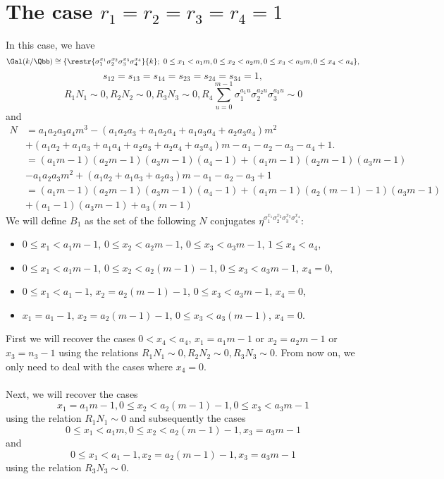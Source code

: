 \section{The case $r_1=r_2=r_3=r_4=1$}
In this case, we have
$$\Gal(k/\Qbb)\cong
 \{\restr{\sigma_1^{x_1}\sigma_2^{x_2}\sigma_3^{x_3}\sigma_4^{x_4}}{k};~  0\leq x_1<a_1m, 0\leq x_2<a_2m, 0\leq x_3<a_3m,0\leq x_4<a_4\},$$
 $$s_{12}=s_{13}=s_{14}=s_{23}=s_{24}=s_{34}=1,$$
$$R_1N_1\sim 0, R_2N_2\sim 0, R_3N_3 \sim 0, R_4 \sum_{u=0}^{m-1}\sigma_1^{a_1u}\sigma_2^{a_2u}\sigma_3^{a_3u} \sim 0$$
and
\begin{align*}
N&=a_1a_2a_3a_4m^3-(a_1a_2a_3+a_1a_2a_4+a_1a_3a_4+a_2a_3a_4)m^2\\
&+(a_1a_2+a_1a_3+a_1a_4+a_2a_3+a_2a_4+a_3a_4)m-a_1-a_2-a_3-a_4+1.\\
&=(a_1m-1)(a_2m-1)(a_3m-1)(a_4-1)+(a_1m-1)(a_2m-1)(a_3m-1)\\
&-a_1a_2a_3m^2+(a_1a_2+a_1a_3+a_2a_3)m-a_1-a_2-a_3+1\\
&=(a_1m-1)(a_2m-1)(a_3m-1)(a_4-1)+(a_1m-1)(a_2(m-1)-1)(a_3m-1)\\
&+(a_1-1)(a_3m-1)+a_3(m-1)
\end{align*}
We will define $B_1$ as the set of the following $N$ conjugates $\eta^{\sigma_1^{x_1}\sigma_2^{x_2}\sigma_3^{x_3}\sigma_4^{x_4}}$:

\begin{itemize}
\item $0\le x_1 <a_1m-1$, $0\le x_2 < a_2m-1$, $ 0 \le x_3<a_3m-1$, $ 1\le x_4<a_4$,
\item $0 \le x_1 <a_1m-1$, $0\le x_2 < a_2(m-1)-1$, $0 \le x_3<a_3m-1$, $ x_4=0$,
\item $0\le x_1 < a_1-1$, $ x_2 =a_2(m-1)-1$, $ 0\leq x_3 < a_3m-1$, $ x_4=0$,
\item $x_1=a_1-1$, $ x_2 =a_2(m-1)-1$, $ 0\leq x_3 < a_3(m-1)$, $ x_4=0$.
\end{itemize}

First we will recover the cases $0<x_4<a_4$, $x_1=a_1m-1$ or $x_2=a_2m-1$ or $x_3=n_3-1$ using the relations $R_1N_1\sim 0, R_2N_2\sim 0, R_3N_3\sim 0$. From now on, we only need to deal with the cases where $x_4=0$.
\paragraph*{}
Next, we will recover the cases $$x_1=a_1m-1, 0\le x_2 < a_2(m-1)-1, 0\leq x_3 <a_3m-1$$ using the relation $R_1N_1\sim 0$ and subsequently the cases $$0\leq x_1 < a_1m,  0\le x_2 < a_2(m-1)-1, x_3 = a_3m-1$$ and $$0\le x_1 < a_1-1, x_2 = a_2(m-1)-1, x_3 = a_3m-1$$ using the relation $R_3N_3\sim 0$.

